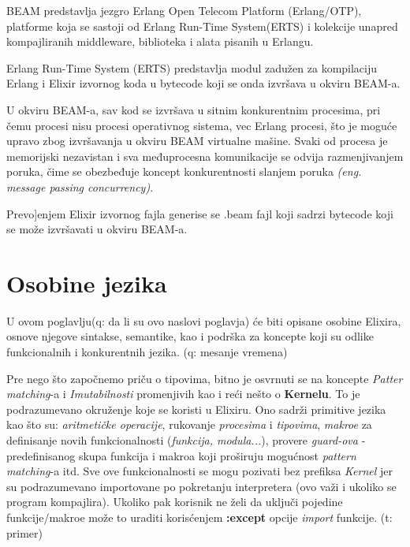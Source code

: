 \documentclass[a4paper]{article}
\begin{document}
BEAM predstavlja jezgro Erlang Open Telecom Platform (Erlang/OTP), platforme koja se sastoji od Erlang Run-Time System(ERTS) i  kolekcije unapred kompajliranih middleware, biblioteka i alata pisanih u Erlangu.

Erlang Run-Time System (ERTS) predstavlja modul zadu\v{z}en za kompilaciju Erlang i Elixir izvornog koda u bytecode koji se onda izvršava u okviru BEAM-a.

U okviru BEAM-a, sav kod se izvršava u sitnim konkurentnim procesima, pri čemu procesi nisu procesi operativnog sistema, vec Erlang procesi, što je moguće upravo zbog izvršavanja u okviru BEAM virtualne mašine. Svaki od procesa je memorijski nezavistan i sva međuprocesna komunikacije se odvija razmenjivanjem poruka, čime se obezbeđuje koncept konkurentnosti slanjem poruka \textit{(eng. message passing concurrency)}. 

Prevo]enjem Elixir izvornog fajla generise se .beam fajl koji sadrzi bytecode koji se može izvršavati u okviru BEAM-a.

\section{Osobine jezika}
\label{sec:osobine}
U ovom poglavlju(q: da li su ovo naslovi poglavja) će biti opisane osobine Elixira, osnove njegove sintakse, semantike, kao i podrška za koncepte koji su odlike funkcionalnih i konkurentnih jezika. (q: mesanje vremena) 

Pre nego što započnemo priču o tipovima, bitno je osvrnuti se na koncepte \textit{Patter matching}-a i \textit{Imutabilnosti} promenjivih kao i reći nešto o \textbf{Kernelu}. To je podrazumevano okruženje koje se koristi u Elixiru. Ono sadrži primitive jezika kao što su: \textit{aritmetičke operacije}, rukovanje \textit{procesima} i \textit{tipovima}, \textit{makroe} za definisanje novih funkcionalnosti (\textit{funkcija, modula...}), provere \textit{guard-ova} - predefinisanog skupa funkcija i makroa koji proširuju mogućnost \textit{pattern matching}-a itd. Sve ove funkcionalnosti se mogu pozivati bez prefiksa \textit{Kernel} jer su podrazumevano importovane po pokretanju interpretera (ovo važi i ukoliko se program kompajlira). Ukoliko pak korisnik ne želi da uključi pojedine funkcije/makroe može to uraditi korisćenjem \textbf{:except} opcije \textit{import} funkcije. (t: primer)
\end{document}
